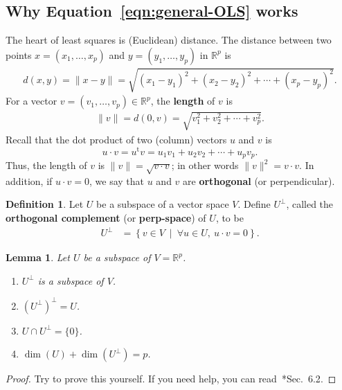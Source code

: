 \documentclass[a4paper, 12pt]{article}
\numberwithin{equation}{section}
\numberwithin{figure}{section}
\newtheorem{lem}[thm]{Lemma}
\theoremstyle{definition}
\newtheorem{defn}[thm]{Definition}
\newcommand{\R}{\mathbb{R}}
\newcommand{\tr}{\mathrm{t}}
\begin{document}
\subsection{Why Equation~\eqref{eqn:general-OLS} works}

The heart of least squares is (Euclidean) distance. The distance between two
points $x = (x_1,\dots, x_p)$ and $y=(y_1,\dots, y_p)$ in $\R^p$ is 
\begin{align*}
	d(x, y) = \| x - y \| = \sqrt{(x_1 - y_1)^2 + (x_2 - y_2)^2 + \cdots + (x_p - y_p)^2}. 
\end{align*}
For a vector $v=(v_1,\dots, v_p)\in\R^p$, the \textbf{length} of $v$ is 
\begin{align*}
	\| v \| = d(0, v) = \sqrt{v_1^2 + v_2^2 + \cdots + v_p^2}.
\end{align*}
Recall that the dot product of two (column) vectors $u$ and $v$ is 
\[ 
	u\cdot v = u^{\tr} v = u_1v_1 + u_2v_2 + \cdots + u_pv_p.
\] 
Thus, the length of $v$ is $\| v \| = \sqrt{v\cdot v}$; in other words $\| v\|^2
= v\cdot v$. In addition, if $u\cdot v = 0$, we say that $u$ and $v$ are
\textbf{orthogonal} (or perpendicular).

\begin{defn}
	Let $U$ be a subspace of a vector space $V$. Define $U^{\perp}$, called the
	\textbf{orthogonal complement} (or \textbf{perp-space}) of $U$, to be
	\begin{align*}
		U^{\perp} &= \left\{v\in V ~\middle|~ \forall u\in U,\ u\cdot v = 0 \right\} . 
	\end{align*}
\end{defn}

\begin{lem}\label{lem:orthogonal-complement}
	Let $U$ be a subspace of $V = \R^p$. 
	\begin{enumerate}
		\item $U^{\perp}$ is a subspace of $V$.
		\item $(U^{\perp})^{\perp} = U$.
		\item $U\cap U^{\perp} = \{0\}$.
		\item $\dim(U) + \dim(U^{\perp}) = p$.
	\end{enumerate}
\end{lem}

\begin{proof}
	Try to prove this yourself. If you need help, you can
	read~\cite{ILA}*{Sec.~6.2}.
\end{proof}
\end{document}
